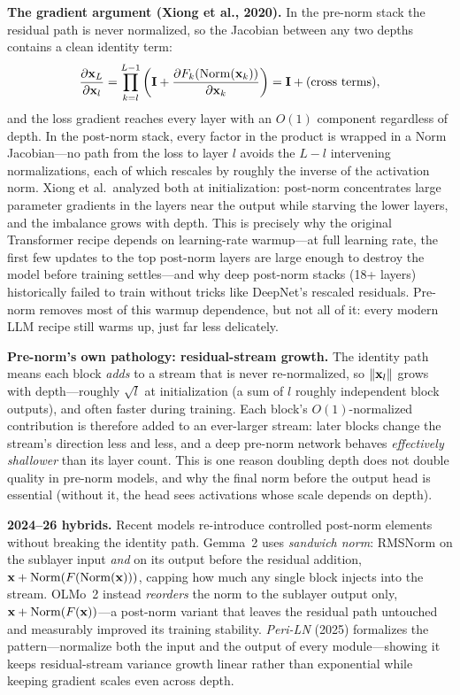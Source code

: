 \textbf{The gradient argument (Xiong et al., 2020).} In the pre-norm stack the residual path is never normalized, so the Jacobian between any two depths contains a clean identity term:
\begin{equation}
\frac{\partial \mathbf{x}_L}{\partial \mathbf{x}_l} = \prod_{k=l}^{L-1}\left(\mathbf{I} + \frac{\partial F_k(\mathrm{Norm}(\mathbf{x}_k))}{\partial \mathbf{x}_k}\right) = \mathbf{I} + (\text{cross terms}),
\end{equation}
and the loss gradient reaches every layer with an $O(1)$ component regardless of depth. In the post-norm stack, every factor in the product is wrapped in a $\mathrm{Norm}$ Jacobian---no path from the loss to layer $l$ avoids the $L - l$ intervening normalizations, each of which rescales by roughly the inverse of the activation norm. Xiong et al.\ analyzed both at initialization: post-norm concentrates large parameter gradients in the layers near the output while starving the lower layers, and the imbalance grows with depth. This is precisely why the original Transformer recipe depends on learning-rate warmup---at full learning rate, the first few updates to the top post-norm layers are large enough to destroy the model before training settles---and why deep post-norm stacks (18+ layers) historically failed to train without tricks like DeepNet's rescaled residuals. Pre-norm removes most of this warmup dependence, but not all of it: every modern LLM recipe still warms up, just far less delicately.

\textbf{Pre-norm's own pathology: residual-stream growth.} The identity path means each block \emph{adds} to a stream that is never re-normalized, so $\|\mathbf{x}_l\|$ grows with depth---roughly $\sqrt{l}$ at initialization (a sum of $l$ roughly independent block outputs), and often faster during training. Each block's $O(1)$-normalized contribution is therefore added to an ever-larger stream: later blocks change the stream's direction less and less, and a deep pre-norm network behaves \emph{effectively shallower} than its layer count. This is one reason doubling depth does not double quality in pre-norm models, and why the final norm before the output head is essential (without it, the head sees activations whose scale depends on depth).

\textbf{2024--26 hybrids.} Recent models re-introduce controlled post-norm elements without breaking the identity path. Gemma~2 uses \emph{sandwich norm}: RMSNorm on the sublayer input \emph{and} on its output before the residual addition, $\mathbf{x} + \mathrm{Norm}(F(\mathrm{Norm}(\mathbf{x})))$, capping how much any single block injects into the stream. OLMo~2 instead \emph{reorders} the norm to the sublayer output only, $\mathbf{x} + \mathrm{Norm}(F(\mathbf{x}))$---a post-norm variant that leaves the residual path untouched and measurably improved its training stability. \emph{Peri-LN} (2025) formalizes the pattern---normalize both the input and the output of every module---showing it keeps residual-stream variance growth linear rather than exponential while keeping gradient scales even across depth.

